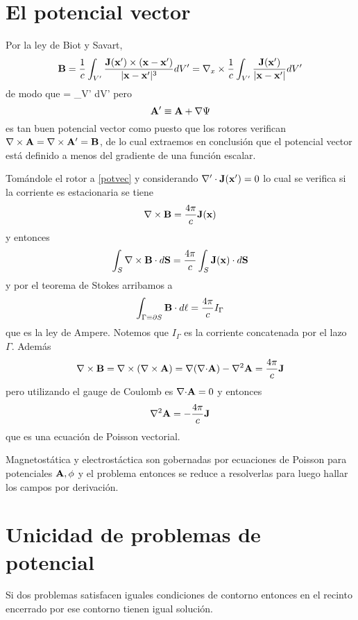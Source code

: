 \documentclass[10pt,oneside]{CBFT_book}
\begin{document}
\section{El potencial vector}

Por la ley de Biot y Savart,
\[
	\vb{B} = \frac{1}{c} \int_{V'} \frac{\vb{J}(\vb{x}') \times (\vb{x}-\vb{x}')}{|\vb{x}-\vb{x}'|^3} 
	dV' = \Nabla_x \times \frac{1}{c} \int_{V'} \frac{\vb{J}(\vb{x}')}{|\vb{x}-\vb{x}'|} dV'
\]
de modo que
\be
	 =  \int_{V'}  dV'
	\label{potvec}
\ee
pero 
\[
	\vb{A}' \equiv \vb{A} + \Nabla \Psi
\]
es tan buen potencial vector como  puesto que los rotores verifican $\rotorm{A}=\rotorm{A}'=\vb{B}$,
de lo cual extraemos en conclusión que el potencial vector está definido a menos del gradiente de una
función escalar.

Tomándole el rotor a \eqref{potvec} y considerando $\Nabla'\cdot\vb{J}(\vb{x}')=0$ lo cual se verifica si
la corriente es estacionaria se tiene 
\[
	\rotorm{B} = \frac{4\pi}{c} \vb{J}(\vb{x})
\]
y entonces
\[
	\int_S \rotorm{B} \cdot d\vb{S} = \frac{4\pi}{c} \int_S \vb{J}(\vb{x}) \cdot d\vb{S}
\]
y por el teorema de Stokes arribamos a
\[
	\int_{\Gamma\equiv\partial S} \vb{B}\cdot d\vb{\ell} = \frac{4\pi}{c} I_\Gamma
\]
que es la ley de Ampere. Notemos que $I_\Gamma$ es la corriente concatenada por el lazo $\Gamma$.
Además
\[
	\rotorm{B} = \Nabla\times(\rotorm{A}) = \Nabla(\divem{A}) - \nabla^2 \vb{A} = \frac{4\pi}{c}\vb{J}
\]
pero utilizando el gauge de Coulomb es $\mathbf{\nabla}\mathbf{\cdot}\mathbf{A}=0$ y entonces
\[
	\nabla^2 \vb{A} = -\frac{4\pi}{c}\vb{J}
\]
que es una ecuación de Poisson vectorial.

Magnetostática y electrostáctica son gobernadas por ecuaciones de Poisson para potenciales $\vb{A},\phi$ y
el problema entonces se reduce a resolverlas para luego hallar los campos por derivación.

\section{Unicidad de problemas de potencial}

Si dos problemas satisfacen iguales condiciones de contorno entonces en el recinto encerrado por
ese contorno tienen igual solución.
\end{document}
